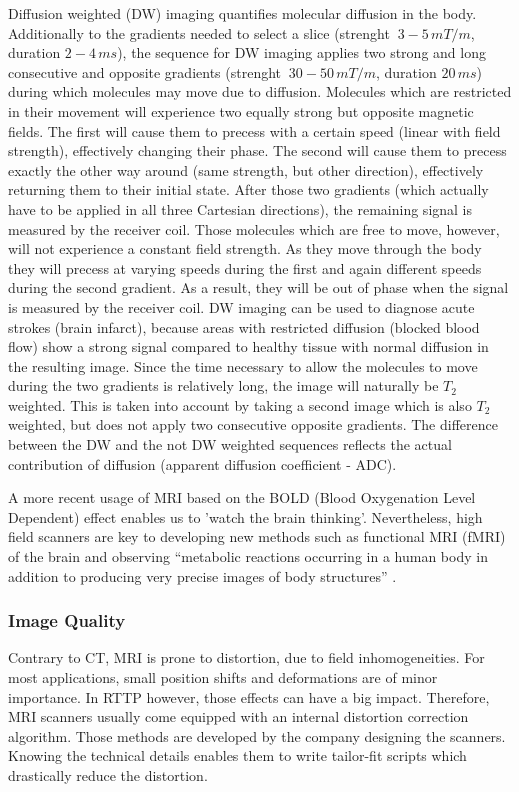 Diffusion weighted (DW) imaging quantifies molecular diffusion in the body.
Additionally to the gradients needed to select a slice (strenght $~3-5\, mT/m$, duration $2-4\, ms$), the sequence for DW imaging applies two strong and long consecutive and opposite gradients (strenght $~30-50\, mT/m$, duration $20\, ms$) during which molecules may move due to diffusion.
Molecules which are restricted in their movement will experience two equally strong but opposite magnetic fields.
The first will cause them to precess with a certain speed (linear with field strength), effectively changing their phase.
The second will cause them to precess exactly the other way around (same strength, but other direction), effectively returning them to their initial state.
After those two gradients (which actually have to be applied in all three Cartesian directions), the remaining signal is measured by the receiver coil.
Those molecules which are free to move, however, will not experience a constant field strength.
As they move through the body they will precess at varying speeds during the first and again different speeds during the second gradient.
As a result, they will be out of phase when the signal is measured by the receiver coil.
DW imaging can be used to diagnose acute strokes (brain infarct), because areas with restricted diffusion (blocked blood flow) show a strong signal compared to healthy tissue with normal diffusion in the resulting image.
Since the time necessary to allow the molecules to move during the two gradients is relatively long, the image will naturally be $T_2$ weighted.
This is taken into account by taking a second image which is also $T_2$ weighted, but does not apply two consecutive opposite gradients.
The difference between the DW and the not DW weighted sequences reflects the actual contribution of diffusion (apparent diffusion
coefficient - ADC).


A more recent usage of MRI based on the BOLD (Blood Oxygenation Level Dependent) effect enables us to 'watch the brain thinking'.
Nevertheless, high field scanners are key to developing new methods such as functional MRI (fMRI) of the brain \cite{Duyn2012} and observing ``metabolic reactions occurring in a human body in addition to producing very precise images of body structures'' \cite{Wada2010}.

\subsubsection{Image Quality}
Contrary to CT, MRI is prone to distortion, due to field inhomogeneities.
For most applications, small position shifts and deformations are of minor importance.
In RTTP however, those effects can have a big impact.
Therefore, MRI scanners usually come equipped with an internal distortion correction algorithm.
Those methods are developed by the company designing the scanners.
Knowing the technical details enables them to write tailor-fit scripts which drastically reduce the distortion.

